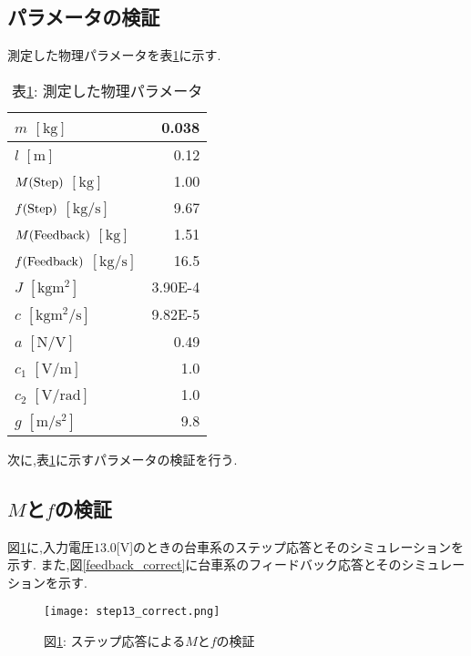 \subsection{パラメータの検証}
測定した物理パラメータを表\ref{pend_params}に示す.

\begin{table}[htbp]
    \begin{center}
        \caption{表\ref{pend_params}: 測定した物理パラメータ}
        \begin{tabular}{|l|r|} \hline
            $m$ $[\mathrm{kg}]$ & 0.038 \\ \hline
            $l$ $[\mathrm{m}]$ & 0.12 \\ \hline
            $M(\rm{Step})$ $[\mathrm{kg}]$ & 1.00 \\ \hline
            $f(\rm{Step})$ $[\mathrm{kg/s}]$ & 9.67 \\ \hline
            $M(\rm{Feedback})$ $[\mathrm{kg}]$ & 1.51 \\ \hline
            $f(\rm{Feedback})$ $[\mathrm{kg/s}]$ & 16.5 \\ \hline
            $J$ $[\mathrm{kgm^2}]$ & 3.90E-4 \\ \hline
            $c$ $[\mathrm{kgm^2/s}]$ & 9.82E-5 \\ \hline
            $a$ $[\mathrm{N/V}]$ & 0.49 \\ \hline
            $c_1$ $[\mathrm{V/m}]$ & 1.0 \\ \hline
            $c_2$ $[\mathrm{V/rad}]$ & 1.0 \\ \hline
            $g$ $[\mathrm{m/s^2}]$ & 9.8 \\ \hline
        \end{tabular}
        \label{pend_params}
    \end{center}
\end{table}

次に,表\ref{pend_params}に示すパラメータの検証を行う.

\subsection{$M$と$f$の検証}
図\ref{step13_correct}に,入力電圧$13.0$[V]のときの台車系のステップ応答とそのシミュレーションを示す.
また,図\ref{feedback_correct}に台車系のフィードバック応答とそのシミュレーションを示す.

\begin{figure}[htbp]
    \begin{center}
        \texttt{[image: step13\_correct.png]}
        \caption{図\ref{step13_correct}: ステップ応答による$M$と$f$の検証}
        \label{step13_correct}
    \end{center}
\end{figure}


